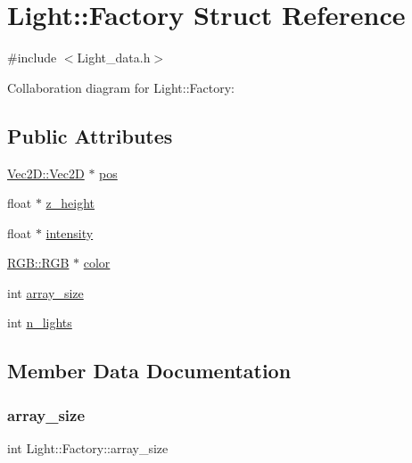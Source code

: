 \hypertarget{struct_light_1_1_factory}{}\section{Light\+:\+:Factory Struct Reference}
\label{struct_light_1_1_factory}


{\ttfamily \#include $<$Light\+\_\+data.\+h$>$}



Collaboration diagram for Light\+:\+:Factory\+:
\subsection*{Public Attributes}
\begin{DoxyCompactItemize}
\item 
\mbox{\hyperlink{struct_vec2_d_1_1_vec2_d}{Vec2\+D\+::\+Vec2D}} $\ast$ \mbox{\hyperlink{struct_light_1_1_factory_aeb98121260e0a0c81dcc7efd07723d42}{pos}}
\item 
float $\ast$ \mbox{\hyperlink{struct_light_1_1_factory_aabfdca2cb1380c5a4723ae165459f1f7}{z\+\_\+height}}
\item 
float $\ast$ \mbox{\hyperlink{struct_light_1_1_factory_ab696f1275f113c762e563f888fa02758}{intensity}}
\item 
\mbox{\hyperlink{struct_r_g_b_1_1_r_g_b}{R\+G\+B\+::\+R\+GB}} $\ast$ \mbox{\hyperlink{struct_light_1_1_factory_aeff3fc69ea651e0fdeb11502515ceaa4}{color}}
\item 
int \mbox{\hyperlink{struct_light_1_1_factory_a0d5fb60797245b1c8ab071353f424f3b}{array\+\_\+size}}
\item 
int \mbox{\hyperlink{struct_light_1_1_factory_a9e78028325e5b8135e9caabe829cd43d}{n\+\_\+lights}}
\end{DoxyCompactItemize}


\subsection{Member Data Documentation}
\mbox{\label{struct_light_1_1_factory_a0d5fb60797245b1c8ab071353f424f3b}} 
\subsubsection{\texorpdfstring{array\+\_\+size}{array\_size}}
{\footnotesize\ttfamily int Light\+::\+Factory\+::array\+\_\+size}

